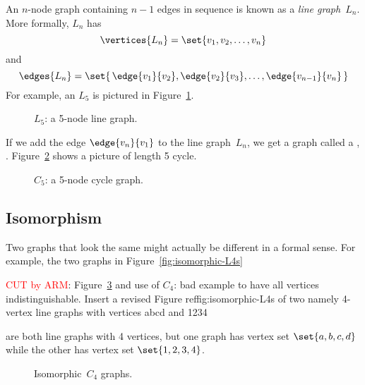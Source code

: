 An $n$-node graph containing $n - 1$ edges in sequence is known as
a \emph{line graph}~$L_n$.  More formally, $L_n$ has
\begin{equation*}
    \vertices{L_n} = \set{ v_1, v_2, \dots, v_n }
\end{equation*}
and
\begin{equation*}
    \edges{L_n} = \set{\, \edge{v_1}{v_2}, \edge{v_2}{v_3}, \dots,
    \edge{v_{n-1}}{v_n} \, }
\end{equation*}
For example, an $L_5$ is pictured in Figure~\ref{fig:graph_L_5}.

\begin{figure}


\caption{$L_5$: a 5-node line graph.}

\label{fig:graph_L_5}

\end{figure}

If we add the edge $\edge{v_n}{v_1}$ to the line graph~$L_n$, we get a
graph called a , .
Figure~\ref{fig:graph_C_5} shows a picture of length 5 cycle.

\begin{figure}


\caption{$C_5$: a 5-node cycle graph.}
\label{fig:graph_C_5}
\end{figure}

\subsection{Isomorphism}

Two graphs that look the same might actually be different in a formal
sense.  For example, the two graphs in Figure~\ref{fig:isomorphic-L4s}
\begin{editingnotes}
  \textcolor{red}{CUT by ARM}: Figure~\ref{fig:isomorphism} and use of
  $C_4$: bad example to have all vertices indistinguishable.  Insert a
  revised Figure ref{fig:isomorphic-L4s} of two namely 4-vertex
  line graphs with vertices abcd and 1234
\end{editingnotes}
 are both line graphs with 4
  vertices, but one graph has vertex set $\set{a,
    b, c, d}$ while the other has vertex set $\set{1, 2, 3, 4}$.
\begin{figure}

\qquad
{}

\caption{Isomorphic~$C_4$ graphs.}
\label{fig:isomorphism}
\end{figure}

